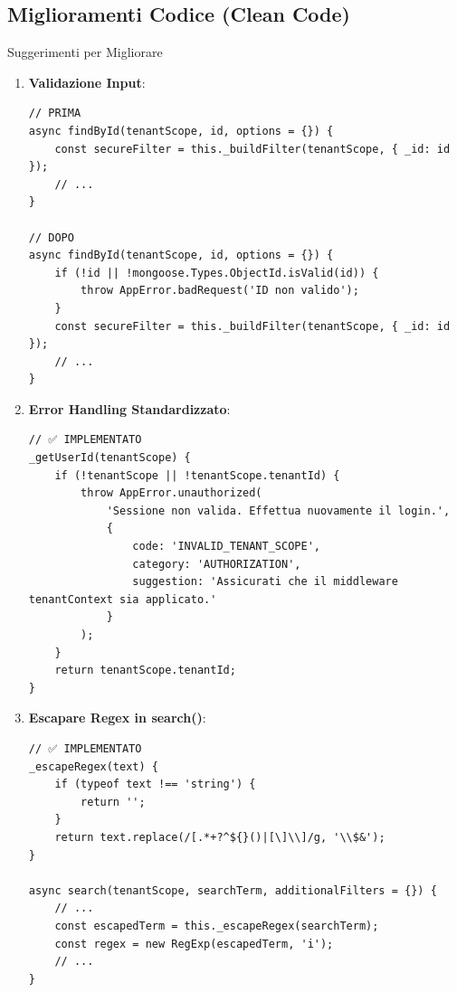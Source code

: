 \documentclass[11pt,a4paper]{article}
\begin{document}
\subsection{Miglioramenti Codice (Clean Code)}

\begin{tipbox}{Suggerimenti per Migliorare}
\end{tipbox}

\begin{enumerate}
    \item \textbf{Validazione Input}:
    \begin{lstlisting}
// PRIMA
async findById(tenantScope, id, options = {}) {
    const secureFilter = this._buildFilter(tenantScope, { _id: id });
    // ...
}

// DOPO
async findById(tenantScope, id, options = {}) {
    if (!id || !mongoose.Types.ObjectId.isValid(id)) {
        throw AppError.badRequest('ID non valido');
    }
    const secureFilter = this._buildFilter(tenantScope, { _id: id });
    // ...
}
    \end{lstlisting}
    
    \item \textbf{Error Handling Standardizzato}:
    \begin{lstlisting}
// ✅ IMPLEMENTATO
_getUserId(tenantScope) {
    if (!tenantScope || !tenantScope.tenantId) {
        throw AppError.unauthorized(
            'Sessione non valida. Effettua nuovamente il login.',
            { 
                code: 'INVALID_TENANT_SCOPE',
                category: 'AUTHORIZATION',
                suggestion: 'Assicurati che il middleware tenantContext sia applicato.'
            }
        );
    }
    return tenantScope.tenantId;
}
    \end{lstlisting}
    
    \item \textbf{Escapare Regex in search()}:
    \begin{lstlisting}
// ✅ IMPLEMENTATO
_escapeRegex(text) {
    if (typeof text !== 'string') {
        return '';
    }
    return text.replace(/[.*+?^${}()|[\]\\]/g, '\\$&');
}

async search(tenantScope, searchTerm, additionalFilters = {}) {
    // ...
    const escapedTerm = this._escapeRegex(searchTerm);
    const regex = new RegExp(escapedTerm, 'i');
    // ...
}
    \end{lstlisting}
    

\end{enumerate}
\end{document}
